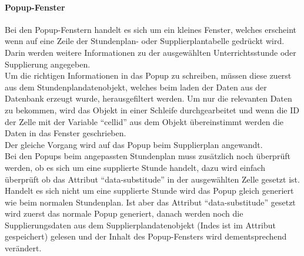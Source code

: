 \paragraph{Popup-Fenster\\}
Bei den Popup-Fenstern handelt es sich um ein kleines Fenster, welches erscheint wenn auf eine Zeile der Stundenplan- oder Supplierplantabelle gedrückt wird. Darin werden weitere Informationen zu der ausgewählten Unterrichtsstunde oder Supplierung angegeben.\\
Um die richtigen Informationen in das Popup zu schreiben, müssen diese zuerst aus dem Stundenplandatenobjekt, welches beim laden der Daten aus der Datenbank erzeugt wurde, herausgefiltert werden. Um nur die relevanten Daten zu bekommen, wird das Objekt in einer Schleife durchgearbeitet und wenn die ID der Zelle mit der Variable \enquote{cellid} aus dem Objekt übereinstimmt werden die Daten in das Fenster geschrieben.\\
Der gleiche Vorgang wird auf das Popup beim Supplierplan angewandt.\\
Bei den Popups beim angepassten Stundenplan muss zusätzlich noch überprüft werden, ob es sich um eine supplierte Stunde handelt, dazu wird einfach überprüft ob das Attribut \enquote{data-substitude} in der ausgewählten Zelle gesetzt ist. Handelt es sich nicht um eine supplierte Stunde wird das Popup gleich generiert wie beim normalen Stundenplan. Ist aber das Attribut \enquote{data-substitude} gesetzt wird zuerst das normale Popup generiert, danach werden noch die Supplierungsdaten aus dem Supplierplandatenobjekt (Indes ist im Attribut gespeichert) gelesen und der Inhalt des Popup-Fensters wird dementsprechend verändert.\\


